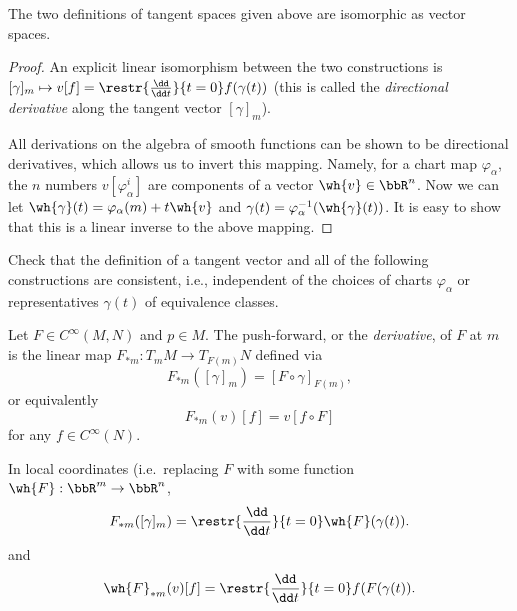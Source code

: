 \begin{prop}
    The two definitions of tangent spaces given above are isomorphic as vector spaces.
\end{prop}
\begin{proof}
    An explicit linear isomorphism between the two constructions is $[\gamma]_m\mapsto v[f]=\restr{\frac{\dd}{\dd t}}{t=0}f(\gamma(t))$ (this is called the \emph{directional derivative} along the tangent vector $[\gamma]_m$). 

    All derivations on the algebra of smooth functions can be shown to be directional derivatives, which allows us to invert this mapping. Namely, for a chart map $\varphi_\alpha$, the $n$ numbers $v[\varphi_\alpha^i]$ are components of a vector $\wh{v}\in \bbR^n$. Now we can let $\wh{\gamma}(t)=\varphi_\alpha(m)+t\wh{v}$ and $\gamma(t)=\varphi_\alpha^{-1}(\wh{\gamma}(t))$. It is easy to show that this is a linear inverse to the above mapping.
\end{proof}


\begin{xca}
    Check that the definition of a tangent vector and all of the following constructions are consistent, i.e., independent of the choices of charts $\varphi_\alpha$ or representatives $\gamma(t)$ of equivalence classes.
    \end{xca}
    \begin{defn}
    Let $F\in C^\infty(M,N)$ and $p\in M$. The push-forward, or the \emph{derivative}, of $F$ at $m$ is the linear map $F_{\ast m}:T_m M\to T_{F(m)} N$ defined via \[F_{\ast m}([\gamma]_m)=[F\circ\gamma]_{F(m)},\] or equivalently \[F_{\ast m}(v)[f]=v[f\circ F]\] for any $f\in C^\infty (N)$.
\end{defn}

\begin{rem}
    In local coordinates (i.e.~replacing $F$ with some function $\wh{F}:\bbR^m\to\bbR^n$,
    \[F_{\ast m}([\gamma]_m)=\restr{\frac{\dd}{\dd t}}{t=0} \wh{F}(\gamma(t)).\label{eq differential in local coordinates}\]
    and 
    \[\wh{F}_{\ast m}(v)[f]=\restr{\frac{\dd}{\dd t}}{t=0}f(F(\gamma(t)).\]
\end{rem}



